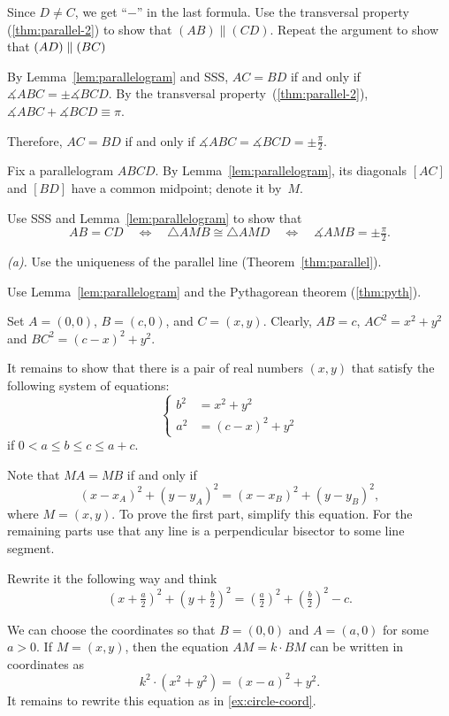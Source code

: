 Since $D\ne C$, we get ``$-$'' in the last formula.
Use the transversal property (\ref{thm:parallel-2}) to show that $(AB)\parallel (CD)$. Repeat the argument to show that $(AD)\z\parallel(BC)$ 

By Lemma~\ref{lem:parallelogram} and SSS, 
$AC=BD$
if and only if
$\measuredangle ABC=\pm \measuredangle BCD$.
By the transversal property~(\ref{thm:parallel-2}), 
$\measuredangle ABC+\measuredangle BCD\equiv \pi$.

Therefore, 
$AC=BD$
if and only if
$\measuredangle ABC
=\measuredangle BCD
=\pm\tfrac\pi2$.

Fix a parallelogram $ABCD$.
By Lemma~\ref{lem:parallelogram},
its diagonals $[AC]$ and $[BD]$ have a common midpoint; denote it by~$M$.

Use SSS and Lemma~\ref{lem:parallelogram} to show that
\[AB=CD
\quad
\iff
\quad
\triangle AMB
\cong
\triangle AMD
\quad
\iff
\quad
\measuredangle AMB
=
\pm\tfrac\pi2.\]

 \textit{(a).} Use the uniqueness of the parallel line (Theorem~\ref{thm:parallel}).

 Use Lemma~\ref{lem:parallelogram} and the Pythagorean theorem (\ref{thm:pyth}).

Set $A=(0,0)$, $B=(c,0)$, and $C=(x,y)$.
Clearly, $AB=c$,
$AC^2=x^2+y^2$ and $BC^2=(c-x)^2+y^2$.

It remains to show that there is a pair of real numbers $(x,y)$ 
that satisfy the following system of equations:
$$
\left\{
\begin{aligned}
b^2&=x^2+y^2
\\
a^2&=(c-x)^2+y^2
\end{aligned}
\right.
$$
if $0<a\le b\le c\le a+c$.

 Note that $MA=MB$ if and only if
\[(x-x_A)^2+(y-y_A)^2=(x-x_B)^2+(y-y_B)^2,\]
where $M=(x,y)$. 
To prove the first part, simplify this equation.
For the remaining parts use that any line is a perpendicular bisector to some line segment.

 Rewrite it the following way and think 
\[(x+\tfrac a2)^2+(y+\tfrac b2)^2=(\tfrac a2)^2+(\tfrac b2)^2-c.\]


We can choose the coordinates so that $B=(0,0)$ and $A=(a,0)$ for some $a>0$.
If $M=(x,y)$, then the equation $AM=k\cdot BM$ can be written in coordinates as 
\[k^2\cdot(x^2+y^2)=(x-a)^2+y^2.\]
It remains to rewrite this equation as in \ref{ex:circle-coord}.


